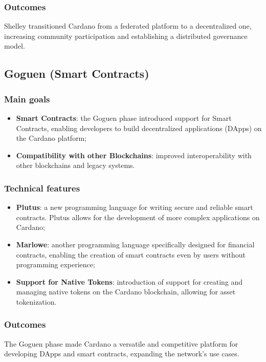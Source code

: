 \subsubsection*{Outcomes}
Shelley transitioned Cardano from a federated platform to a decentralized one, 
increasing community participation and establishing a distributed governance model.

\vspace{0.3cm}

\subsection{Goguen (Smart Contracts)}

\subsubsection*{Main goals}
\begin{itemize}
    \item \textbf{Smart Contracts}: the Goguen phase introduced support for \gls{Smart 
        Contracts}, enabling developers to build decentralized applications (DApps) 
        on the Cardano platform;
    \item \textbf{Compatibility with other Blockchains}: improved interoperability 
        with other blockchains and legacy systems.
\end{itemize}

\subsubsection*{Technical features}
\begin{itemize}
    \item \textbf{Plutus}: a new programming language for writing secure and reliable 
        smart contracts. Plutus allows for the development of more complex applications 
        on Cardano;
    \item \textbf{Marlowe}: another programming language specifically designed for 
        financial contracts, enabling the creation of smart contracts even by users 
        without programming experience;
    \item \textbf{Support for Native Tokens}: introduction of support for creating 
        and managing native tokens on the Cardano blockchain, allowing for asset 
        tokenization.
\end{itemize}

\subsubsection*{Outcomes}
The Goguen phase made Cardano a versatile and competitive platform for developing DApps 
and smart contracts, expanding the network's use cases.

